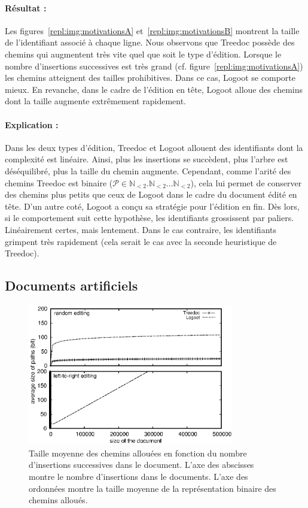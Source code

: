 \paragraph{Résultat :} Les figures~\ref{repl:img:motivationsA}
et~\ref{repl:img:motivationsB} montrent la taille de l'identifiant associé à
chaque ligne. Nous observons que Treedoc possède des chemins qui augmentent très
vite quel que soit le type d'édition. Lorsque le nombre d'insertions successives
est très grand (cf. figure~\ref{repl:img:motivationsA}) les chemins atteignent
des tailles prohibitives. Dans ce cas, Logoot se comporte mieux. En revanche,
dans le cadre de l'édition en tête, Logoot alloue des chemins dont la taille
augmente extrêmement rapidement.

\paragraph{Explication :} Dans les deux types d'édition, Treedoc et Logoot
allouent des identifiants dont la complexité est linéaire. Ainsi, plus les
insertions se succèdent, plus l'arbre est déséquilibré, plus la taille du chemin
augmente. Cependant, comme l'arité des chemins Treedoc est binaire
($\mathcal{P}\in \mathbb{N}_{<2}.\mathbb{N}_{<2}\ldots\mathbb{N}_{<2}$), cela
lui permet de conserver des chemins plus petits que ceux de Logoot dans le cadre
du document édité en tête. D'un autre coté, Logoot a conçu sa stratégie pour
l'édition en fin. Dès lors, si le comportement suit cette hypothèse, les
identifiants grossissent par paliers. Linéairement certes, mais lentement. Dans
le cas contraire, les identifiants grimpent très rapidement (cela serait le cas
avec la seconde heuristique de Treedoc).

\subsection{Documents artificiels}


\begin{figure}
  \begin{center}
    \includegraphics[width=0.8\textwidth]{img/lseq/motivationartificial.eps}
    \caption{\label{repl:img:motivationartificial}Taille moyenne des chemins
      allouées en fonction du nombre d'insertions successives dans le
      document. L'axe des abscisses montre le nombre d'insertions dans le
      documents. L'axe des ordonnées montre la taille moyenne de la
      représentation binaire des chemins alloués.}
  \end{center}
\end{figure}

